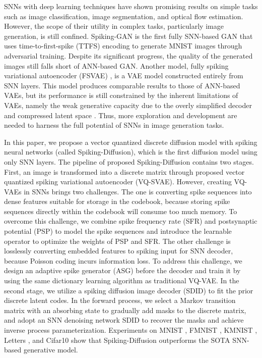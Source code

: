 \documentclass{article}
\begin{document}
SNNs with deep learning techniques have shown promising results on simple tasks such as image classification, image segmentation, and optical flow estimation\cite{snn}. However, the scope of their utility in complex tasks, particularly image generation, is still confined. Spiking-GAN \cite{b17} is the first fully SNN-based GAN that uses time-to-first-spike (TTFS) encoding to generate MNIST images through adversarial training. Despite its significant progress, the quality of the generated images still falls short of ANN-based GAN. Another model, fully spiking variational autoencoder (FSVAE) \cite{b22}, is a VAE model constructed entirely from SNN layers. This model produces comparable results to those of ANN-based VAEs, but its performance is still constrained by the inherent limitations of VAEs, namely the weak generative capacity due to the overly simplified decoder and compressed latent space \cite{b24}. Thus, more exploration and development are needed to harness the full potential of SNNs in image generation tasks. 

In this paper, we propose a vector quantized discrete diffusion model with spiking neural networks (called Spiking-Diffusion), which is the first diffusion model using only SNN layers. The pipeline of proposed Spiking-Diffusion contains two stages. First, an image is transformed into a discrete matrix through proposed vector quantized spiking variational autoencoder (VQ-SVAE). However, creating VQ-VAEs \cite{b3} in SNNs brings two challenges. The one is converting spike sequences into dense features suitable for storage in the codebook, because storing spike sequences directly within the codebook will consume too much memory. To overcome this challenge, we combine spike frequency rate (SFR) and postsynaptic potential (PSP) to model the spike sequences and introduce the learnable operator  to optimize the weights of PSP and SFR. The other challenge is losslessly converting embedded features to spiking input for SNN decoder, because Poisson coding incurs information loss. To address this challenge, we design an adaptive spike generator (ASG) before the decoder and train it by using the same dictionary learning algorithm as traditional VQ-VAE. In the second stage, we utilize a spiking diffusion image decoder (SDID) to fit the prior discrete latent codes. In the forward process, we select a Markov transition matrix with an absorbing state \cite{b30} to gradually add masks to the discrete matrix, and adopt an SNN denoising network SDID to recover the masks and achieve inverse process parameterization. Experiments on MNIST \cite{b20}, FMNIST \cite{b31}, KMNIST \cite{b32}, Letters \cite{b33}, and Cifar10 \cite{cifar10} show that Spiking-Diffusion outperforms the SOTA SNN-based generative model.
\end{document}
